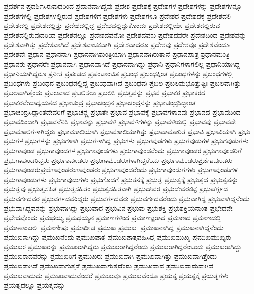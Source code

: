 {ಪ್ರದರ್ಶನ
ಪ್ರದರ್ಶಿಸಿರುವುದರಿಂದ
ಪ್ರದಾನವಾಗಿದ್ದವು
ಪ್ರದೇಶ
ಪ್ರದೇಶಕ್ಕೆ
ಪ್ರದೇಶಗಳ
ಪ್ರದೇಶಗಳನ್ನು
ಪ್ರದೇಶಗಳನ್ನೂ
ಪ್ರದೇಶಗಳಲ್ಲಿ
ಪ್ರದೇಶಗಳಲ್ಲಿರುವ
ಪ್ರದೇಶಗಳಿಗೆ
ಪ್ರದೇಶಗಳು
ಪ್ರದೇಶಗಳೂ
ಪ್ರದೇಶದ
ಪ್ರದೇಶದಕ್ಕೆ
ಪ್ರದೇಶದಲಿ
ಪ್ರದೇಶದಲ್ಲಿ
ಪ್ರದೇಶದಲ್ಲಿತ್ತು
ಪ್ರದೇಶದಲ್ಲಿದ್ದ
ಪ್ರದೇಶದಲ್ಲಿದ್ದುಕೊಂಡು
ಪ್ರದೇಶದಲ್ಲಿಯೇ
ಪ್ರದೇಶದಲ್ಲಿರುವ
ಪ್ರದೇಶದಲ್ಲಿರುವುದರಿಂದ
ಪ್ರದೇಶದಲ್ಲೂ
ಪ್ರದೇಶದವನೋ
ಪ್ರದೇಶದವರು
ಪ್ರದೇಶದವರೇ
ಪ್ರದೇಶದಿಂದ
ಪ್ರದೇಶವನ್ನು
ಪ್ರದೇಶವಾಗಿತ್ತು
ಪ್ರದೇಶವಾಗಿದೆ
ಪ್ರದೇಶವಾಚಕವಾಗಿ
ಪ್ರದೇಶವಾದರೂ
ಪ್ರದೇಶವು
ಪ್ರದೇಶವೂ
ಪ್ರದೇಶವೆಂದೂ
ಪ್ರದೇಶವೇ
ಪ್ರಧಾನ
ಪ್ರಧಾನನಾಗಿ
ಪ್ರಧಾನನಾಗಿಮಂತ್ರಿಯಾಗಿ
ಪ್ರಧಾನನಾಗಿರುತ್ತಾನೆ
ಪ್ರಧಾನಪಾತ್ರ
ಪ್ರಧಾನಮಂತ್ರಿ
ಪ್ರಧಾನರು
ಪ್ರಧಾನರೇ
ಪ್ರಧಾನವಾಗಿ
ಪ್ರಧಾನವಾಗಿದೆ
ಪ್ರಧಾನವಾಗಿದ್ದು
ಪ್ರಧಾನಿ
ಪ್ರಧಾನಿಗಳಾಗಲಿಲ್ಲ
ಪ್ರಧಾನಿಯಾಗಿದ್ದ
ಪ್ರಧಾನಿಯಾಗಿದ್ದರೂ
ಪ್ರನೀತ
ಪ್ರಪಂಚದ
ಪ್ರಪಂಚಾಂಚಿತ
ಪ್ರಬಂಧ
ಪ್ರಬಂಧಕ್ಕಿಂತ
ಪ್ರಬಂಧಗಳನ್ನು
ಪ್ರಬಂಧಗಳಲ್ಲಿ
ಪ್ರಬಂಧಗಳು
ಪ್ರಬಂಧದ
ಪ್ರಬಂಧದಲ್ಲಿದ್ದ
ಪ್ರಬಂಧವಾಗಿದೆ
ಪ್ರಬಂಧವು
ಪ್ರಬಲ
ಪ್ರಬಲಮಭೂತ್ತುಷ್ಟಿಃ
ಪ್ರಬಲವಾಗಿತ್ತು
ಪ್ರಬಲವಾಗಿತ್ತೆಂದು
ಪ್ರಬಲವಾದ
ಪ್ರಬಲಿಸಲು
ಪ್ರಬಲಿಸಿ
ಪ್ರಭತ್ವವನ್ನು
ಪ್ರಭವ
ಪ್ರಭಾಕರ
ಪ್ರಭಾಕರದ
ಪ್ರಭಾಕರವೇದಾಧ್ಯಯನದ
ಪ್ರಭಾಚಂದ್ರ
ಪ್ರಭಾಚಂದ್ರನ
ಪ್ರಭಾಚಂದ್ರನನ್ನು
ಪ್ರಭಾಚಂದ್ರಸಿದ್ಧಾಂತ
ಪ್ರಭಾಚಂದ್ರಸಿದ್ಧಾಂತದೇವರಿಗೆ
ಪ್ರಭಾಚನ್ದ್ರ
ಪ್ರಭಾತೇ
ಪ್ರಭಾವ
ಪ್ರಭಾವಕ್ಕೆ
ಪ್ರಭಾವಗಳಾದವು
ಪ್ರಭಾವದ
ಪ್ರಭಾವದಿಂದ
ಪ್ರಭಾವದಿಂದಾಗಿ
ಪ್ರಭಾವನೆನಿಸಿ
ಪ್ರಭಾವನ್ನು
ಪ್ರಭಾವಳಿ
ಪ್ರಭಾವಳಿಗಳನ್ನು
ಪ್ರಭಾವಳಿಯಲ್ಲಿ
ಪ್ರಭಾವವು
ಪ್ರಭಾವವೇ
ಪ್ರಭಾವಶಾಲಿಗಳಾಗಿದ್ದರು
ಪ್ರಭಾವಶಾಲಿಯಾಗಿ
ಪ್ರಭಾವಶಾಲಿಯಾಗಿತ್ತು
ಪ್ರಭಾವಾವತಾರಿತ
ಪ್ರಭಾವಿ
ಪ್ರಭಾವಿಯಾಗಿ
ಪ್ರಭು
ಪ್ರಭುಗಳ
ಪ್ರಭುಗಳನ್ನು
ಪ್ರಭುಗಳಾಗಿ
ಪ್ರಭುಗಳಾಗಿದ್ದ
ಪ್ರಭುಗಳು
ಪ್ರಭುಗವುಡಗಳು
ಪ್ರಭುಗವುಡುಗಳ
ಪ್ರಭುಗವುಡುಗಳು
ಪ್ರಭುಗಾವುಂಡ
ಪ್ರಭುಗಾವುಂಡಗಳ
ಪ್ರಭುಗಾವುಂಡಗಳು
ಪ್ರಭುಗಾವುಂಡನೆಂದು
ಪ್ರಭುಗಾವುಂಡರ
ಪ್ರಭುಗಾವುಂಡರಿಗೆ
ಪ್ರಭುಗಾವುಂಡರಿದ್ದರು
ಪ್ರಭುಗಾವುಂಡರು
ಪ್ರಭುಗಾವುಂಡರುಗಳಾಗಿದ್ದರೆಂದು
ಪ್ರಭುಗಾವುಂಡರುಪ್ರಜೆಗಾವುಂಡರು
ಪ್ರಭುಗಾವುಂಡರುಪ್ರಜೆಗಾವುಂಡರುಗಾವುಂಡರು
ಪ್ರಭುಗಾವುಂಡರೆಂದು
ಪ್ರಭುಗಾವುಂಡುಗಗಳು
ಪ್ರಭುಗಾವುಂಡುಗಳ
ಪ್ರಭುಗಾವುಂಡುಗಳು
ಪ್ರಭುಗಾವುಡುಗಳು
ಪ್ರಭುಗೊಡಗೆ
ಪ್ರಭುತನಕ್ಕೆ
ಪ್ರಭುತ್ವ
ಪ್ರಭುತ್ವಕ್ಕೆ
ಪ್ರಭುತ್ವದ
ಪ್ರಭುತ್ವವನ್ನು
ಪ್ರಭುತ್ವವು
ಪ್ರಭುತ್ವಸಹಿತ
ಪ್ರಭುತ್ವಸಹಿತಂ
ಪ್ರಭುತ್ವಸಹಿತವಾಗಿ
ಪ್ರಭುದೇವರ
ಪ್ರಭುದೇವರಕಟ್ಟೆ
ಪ್ರಭುಪೆರ್ಗ್ಗಡೆ
ಪ್ರಭುವರ್ಗದವರ
ಪ್ರಭುವರ್ಗದವರಿದ್ದರು
ಪ್ರಭುವರ್ಗದವರು
ಪ್ರಭುವರ್ಗದವರೆಂದು
ಪ್ರಭುವಾಗಿದ್ದ
ಪ್ರಭುವಾಗಿದ್ದನೆಂದು
ಪ್ರಭುವಾಗಿದ್ದವನನ್ನು
ಪ್ರಭುವಾಗಿದ್ದು
ಪ್ರಭುವಾದ
ಪ್ರಭುವಿನ
ಪ್ರಭುವು
ಪ್ರಭುಶಕ್ತಿ
ಪ್ರಭುಶಕ್ತಿಯನಾಂತ
ಪ್ರಭೇದವೇ
ಪ್ರಭೇದವೊಂದು
ಪ್ರಮಥಯ್ಯ
ಪ್ರಮಥಯ್ಯನ
ಪ್ರಮಾಣಗಳಿಂದ
ಪ್ರಮಾಣಜ್ಞರಾದ
ಪ್ರಮಾಣದ
ಪ್ರಮಾಣದಲ್ಲಿ
ಪ್ರಮಾಣಾಂಜಲಿಃ
ಪ್ರಮಾಣೀಷು
ಪ್ರಮಾದೀಚ
ಪ್ರಮುಖ
ಪ್ರಮುಖಃ
ಪ್ರಮುಖನಾಗಿದ್ದ
ಪ್ರಮುಖನಾಗಿದ್ದನೆಂದು
ಪ್ರಮುಖನಾಗಿದ್ದು
ಪ್ರಮುಖನೆಂದು
ಪ್ರಮುಖಪಾತ್ರ
ಪ್ರಮುಖಪಾತ್ರವಹಿಸಿದ್ದ
ಪ್ರಮುಖಮುಖ್ಯ
ಪ್ರಮುಖಮುಖ್ಯರು
ಪ್ರಮುಖರ
ಪ್ರಮುಖರನ್ನು
ಪ್ರಮುಖರಾಗಿದ್ದರು
ಪ್ರಮುಖರಾಗಿದ್ದರೆಂದು
ಪ್ರಮುಖರಾಗಿದ್ದರೆಂಬುದು
ಪ್ರಮುಖರಾಗಿದ್ದು
ಪ್ರಮುಖರಾದವರನ್ನು
ಪ್ರಮುಖರಿಗೆ
ಪ್ರಮುಖರು
ಪ್ರಮುಖವಾಗಿ
ಪ್ರಮುಖವಾಗಿತ್ತು
ಪ್ರಮುಖವಾಗಿತ್ತೆಂದು
ಪ್ರಮುಖವಾಗಿವೆ
ಪ್ರಮುಖವಾಗುತ್ತದೆ
ಪ್ರಮುಖವಾಗುತ್ತದೆಂದು
ಪ್ರಮುಖವಾದ
ಪ್ರಮುಖವಾದುದಾಗಿವೆ
ಪ್ರಮುಖವಾದುದು
ಪ್ರಮುಖವಾದುವೆಂದರೆ
ಪ್ರಮುಖವೂ
ಪ್ರಮುಖವೆಂದೂ
ಪ್ರಯತ್ನ
ಪ್ರಯತ್ನಕ್ಕೆ
ಪ್ರಯತ್ನಗಳು
ಪ್ರಯತ್ನದಲ್ಲೂ
ಪ್ರಯತ್ನವನ್ನು
}
